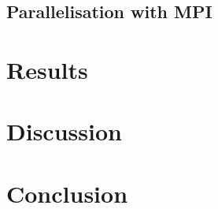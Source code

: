 \documentclass[a4paper, 11pt, oneside]{scrartcl}
\begin{document}
\subsection*{Parallelisation with MPI}

\section{Results}

\section{Discussion}

\section{Conclusion}

\blindtext



\end{document}
